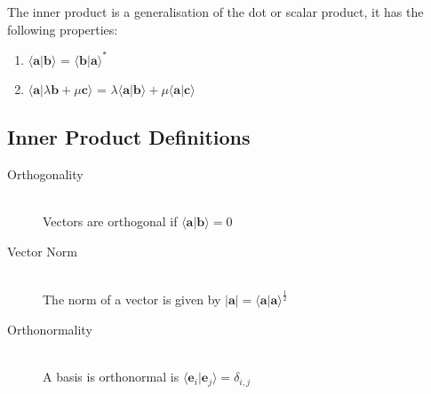 \documentclass{article}
\begin{document}
The inner product is a generalisation of the dot or scalar product, it has the following properties:

\renewcommand{\theenumi}{\roman{enumi}}
\begin{enumerate}
\item $\langle \textbf{a} | \textbf{b} \rangle$ = $\langle \textbf{b} | \textbf{a} \rangle^*$
\item $\langle \textbf{a} | \lambda \textbf{b} + \mu \textbf{c} \rangle$ = $\lambda \langle \textbf{a} | \textbf{b} \rangle + \mu \langle \textbf{a} | \textbf{c} \rangle$
\end{enumerate}

\subsection{Inner Product Definitions}

\begin{description}
  \item[Orthogonality] \hfill \\ Vectors are orthogonal if $ \langle \textbf{a} | \textbf{b} \rangle  = 0 $
  \item[Vector Norm] \hfill \\ The norm of a vector is given by $ | \textbf{a} | = \langle \textbf{a} | \textbf{a} \rangle ^{\frac{1}{2}} $
  \item[Orthonormality] \hfill \\ A basis is orthonormal is $ \langle \textbf{e}_i | \textbf{e}_j \rangle  = \delta_{i,j} $
\end{description}
\end{document}
